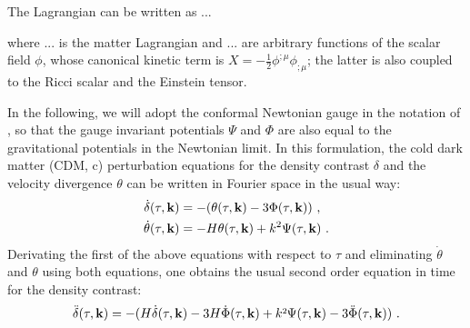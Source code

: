 The Lagrangian can be written as ...

where ... is the matter Lagrangian and ... are arbitrary functions
of the scalar field $\phi$, whose canonical kinetic term is $X=-\frac{1}{2}\phi^{;\mu}\phi_{;\mu}$;
the latter is also coupled to the Ricci scalar and the Einstein tensor.

In the following, we will adopt the conformal Newtonian gauge in the
notation of \citep{MaBertschinger}, so that the gauge invariant potentials
$\Psi$ and $\Phi$ are also equal to the gravitational potentials
in the Newtonian limit. In this formulation, the cold dark matter
(CDM, c) perturbation equations for the density contrast $\delta$
and the velocity divergence $\theta$ can be written in Fourier space
in the usual way: 
\begin{align}
\dot{\delta}(\tau,\mathbf{k}) & =-(\theta(\tau,\mathbf{k})-3\Phi(\tau,\mathbf{k}))\,\,,\\
\dot{\theta}(\tau,\mathbf{k}) & =-H\theta(\tau,\mathbf{k})+k^{2}\Psi(\tau,\mathbf{k})\,\,.
\end{align}
Derivating the first of the above equations with respect to $\tau$
and eliminating $\dot{\theta}$ and $\theta$ using both equations,
one obtains the usual second order equation in time for the density
contrast: 
\begin{equation}
\ddot{\delta}(\tau,\vk k)=-(H\dot{\delta}(\tau,\vk k)-3H\dot{\Phi}(\tau,\vk k)+k\text{\texttwosuperior}\Psi(\tau,\vk k)-3\ddot{\Phi}(\tau,\vk k))\,\,.\label{eq:deltadotdot}
\end{equation}

